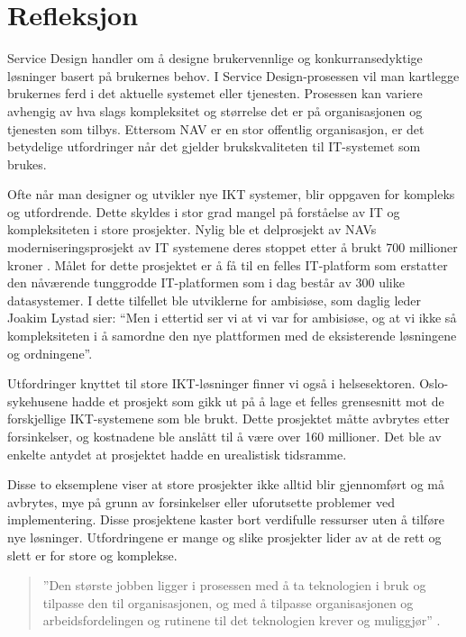 \documentclass[informationsecurity]{gucmasterproject}
\begin{document}
\chapter{Refleksjon}
Service Design handler om å designe brukervennlige og konkurransedyktige løsninger basert på brukernes behov. I Service Design-prosessen vil man kartlegge brukernes ferd i det aktuelle systemet eller tjenesten. Prosessen kan variere avhengig av hva slags kompleksitet og størrelse det er på organisasjonen og tjenesten som tilbys. Ettersom NAV er en stor offentlig organisasjon, er det betydelige utfordringer når det gjelder brukskvaliteten til IT-systemet som brukes.

Ofte når man designer og utvikler nye IKT systemer, blir oppgaven for kompleks og utfordrende. Dette skyldes i stor grad mangel på forståelse av IT og kompleksiteten i store prosjekter. Nylig ble et delprosjekt av NAVs moderniseringsprosjekt av IT systemene deres stoppet etter å brukt 700 millioner kroner \cite{stansetprosjekt}. Målet for dette prosjektet er å få til en felles IT-platform som erstatter den nåværende tunggrodde IT-platformen som i dag består av 300 ulike datasystemer. I dette tilfellet ble utviklerne for ambisiøse, som daglig leder Joakim Lystad sier: “Men i ettertid ser vi at vi var for ambisiøse, og at vi ikke så kompleksiteten i å samordne den nye plattformen med de eksisterende løsningene og ordningene”.

Utfordringer knyttet til store IKT-løsninger finner vi også i helsesektoren. Oslo-sykehusene hadde et prosjekt som gikk ut på å lage et felles grensesnitt mot de forskjellige IKT-systemene som ble brukt. Dette prosjektet måtte avbrytes etter forsinkelser, og kostnadene ble anslått til å være over 160 millioner. Det ble av enkelte antydet at prosjektet hadde en urealistisk tidsramme.

Disse to eksemplene viser at store prosjekter ikke alltid blir gjennomført og må avbrytes, mye på grunn av forsinkelser eller uforutsette problemer ved implementering. Disse prosjektene kaster bort verdifulle ressurser uten å tilføre nye løsninger. Utfordringene er mange og slike prosjekter lider av at de rett og slett er for store og komplekse.

\begin{quote}
''Den største jobben ligger i prosessen med å ta teknologien i bruk og tilpasse den til organisasjonen, og med å tilpasse organisasjonen og arbeidsfordelingen og rutinene til det teknologien krever og muliggjør'' \cite{aanestad}.
\end{quote}
\end{document}
